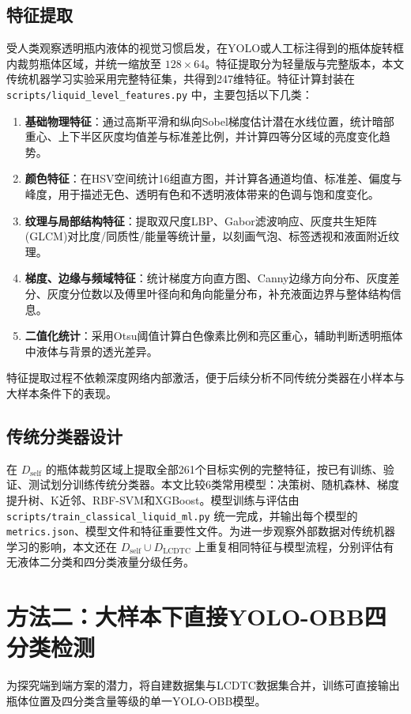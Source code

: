 \documentclass[withoutpreface,bwprint]{cumcmthesis}
\begin{document}
\subsection{特征提取}
受人类观察透明瓶内液体的视觉习惯启发，在YOLO或人工标注得到的瓶体旋转框内裁剪瓶体区域，并统一缩放至 $128\times64$。特征提取分为轻量版与完整版本，本文传统机器学习实验采用完整特征集，共得到247维特征。特征计算封装在 \texttt{scripts/liquid\_level\_features.py} 中，主要包括以下几类：
\begin{enumerate}[label=(\arabic*)]
    \item \textbf{基础物理特征}：通过高斯平滑和纵向Sobel梯度估计潜在水线位置，统计暗部重心、上下半区灰度均值差与标准差比例，并计算四等分区域的亮度变化趋势。
    \item \textbf{颜色特征}：在HSV空间统计16组直方图，并计算各通道均值、标准差、偏度与峰度，用于描述无色、透明有色和不透明液体带来的色调与饱和度变化。
    \item \textbf{纹理与局部结构特征}：提取双尺度LBP、Gabor滤波响应、灰度共生矩阵(GLCM)对比度/同质性/能量等统计量，以刻画气泡、标签透视和液面附近纹理。
    \item \textbf{梯度、边缘与频域特征}：统计梯度方向直方图、Canny边缘方向分布、灰度差分、灰度分位数以及傅里叶径向和角向能量分布，补充液面边界与整体结构信息。
    \item \textbf{二值化统计}：采用Otsu阈值计算白色像素比例和亮区重心，辅助判断透明瓶体中液体与背景的透光差异。
\end{enumerate}
特征提取过程不依赖深度网络内部激活，便于后续分析不同传统分类器在小样本与大样本条件下的表现。

\subsection{传统分类器设计}
在 $D_{\text{self}}$ 的瓶体裁剪区域上提取全部261个目标实例的完整特征，按已有训练、验证、测试划分训练传统分类器。本文比较6类常用模型：决策树、随机森林、梯度提升树、K近邻、RBF-SVM和XGBoost。模型训练与评估由 \texttt{scripts/train\_classical\_liquid\_ml.py} 统一完成，并输出每个模型的 \texttt{metrics.json}、模型文件和特征重要性文件。为进一步观察外部数据对传统机器学习的影响，本文还在 $D_{\text{self}}\cup D_{\text{LCDTC}}$ 上重复相同特征与模型流程，分别评估有无液体二分类和四分类液量分级任务。

\section{方法二：大样本下直接YOLO-OBB四分类检测}
为探究端到端方案的潜力，将自建数据集与LCDTC数据集合并，训练可直接输出瓶体位置及四分类含量等级的单一YOLO-OBB模型。
\end{document}

